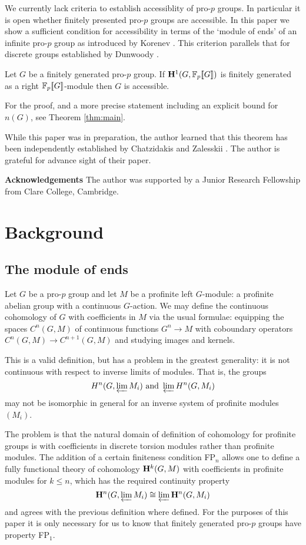 \documentclass[draft, a4paper]{article}
\begin{document}
We currently lack criteria to establish accessiblity of pro-$p$ groups. In particular it is open whether finitely presented pro-$p$ groups are accessible. In this paper we show a sufficient condition for accessibility in terms of the `module of ends' of an infinite pro-$p$ group as introduced by Korenev \cite{Korenev04}. This criterion parallels that for discrete groups established by Dunwoody \cite{Dunwoody79}. 
\begin{theorem}
Let $G$ be a finitely generated pro-$p$ group. If ${\bf H}^1(G,{\mathbb{F}_p[\![G]\!]})$ is finitely generated as a right ${\mathbb{F}_p[\![G]\!]}$-module then $G$ is accessible. 
\end{theorem}
For the proof, and a more precise statement including an explicit bound for $n(G)$, see Theorem \ref{thm:main}.
\begin{rmk}
While this paper was in preparation, the author learned that this theorem has been independently established by Chatzidakis and Zalesskii \cite{CZ20}. The author is grateful for advance sight of their paper.
\end{rmk}

{\noindent\bf Acknowledgements} The author was supported by a Junior Research Fellowship from Clare College, Cambridge.
\section{Background}
\subsection{The module of ends}

Let $G$ be a pro-$p$ group and let $M$ be a profinite left $G$-module: a profinite abelian group with a continuous $G$-action. We may define the continuous cohomology of $G$ with coefficients in $M$ via the usual formulae: equipping the spaces $C^n(G,M)$ of continuous functions $G^n\to M$ with coboundary operators $C^n(G,M)\to C^{n+1}(G,M)$ and studying images and kernels.

This is a valid definition, but has a problem in the greatest generality: it is not continuous with respect to inverse limits of modules. That is, the groups
\[H^n(G,\varprojlim M_i)\text{ and } \varprojlim H^n(G,M_i)\]
may not be isomorphic in general for an inverse system of profinite modules $(M_i)$.

The problem is that the natural domain of definition of cohomology for profinite groups is with coefficients in discrete torsion modules rather than profinite modules. The addition of a certain finiteness condition FP${}_n$ allows one to define a fully functional theory of cohomology ${\bf H}^k(G,M)$ with coefficients in profinite modules for $k\leq n$, which has the required continuity property
\[{\bf H}^n(G,\varprojlim M_i)\cong \varprojlim {\bf H}^n(G,M_i)\] and agrees with the previous definition where defined. For the purposes of this paper it is only necessary for us to know that finitely generated pro-$p$ groups have property FP${}_1$.
\end{document}
